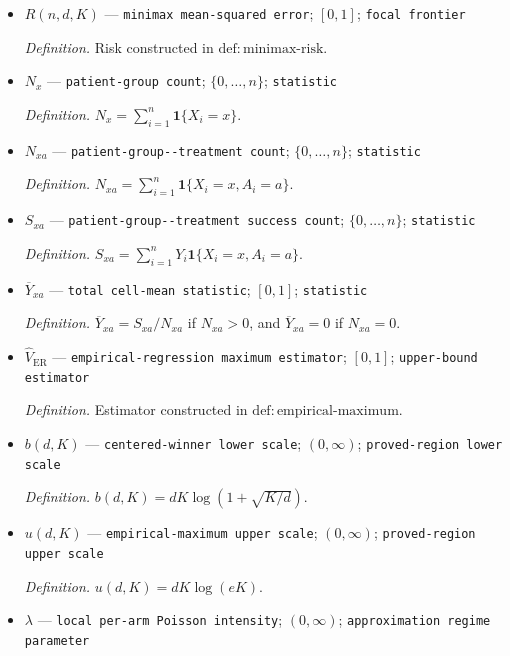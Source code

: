 \documentclass{article}
\begin{document}
\begin{itemize}
  \par\smallskip\noindent\emph{Definition.} Generic measurable estimator of \(V^\star(P)\).
  \item \(R(n,d,K)\) --- \texttt{minimax mean-\allowbreak{}squared error}; \([0,1]\); \texttt{focal frontier}
  \par\smallskip\noindent\emph{Definition.} Risk constructed in \(\mathrm{def{:}minimax\text{-}risk}\).
  \item \(N_x\) --- \texttt{patient-\allowbreak{}group count}; \(\{0,\ldots,n\}\); \texttt{statistic}
  \par\smallskip\noindent\emph{Definition.} \(N_x=\sum_{i=1}^n\mathbf 1\{X_i=x\}\).
  \item \(N_{xa}\) --- \texttt{patient-\allowbreak{}group-\allowbreak{}-\allowbreak{}treatment count}; \(\{0,\ldots,n\}\); \texttt{statistic}
  \par\smallskip\noindent\emph{Definition.} \(N_{xa}=\sum_{i=1}^n\mathbf 1\{X_i=x,A_i=a\}\).
  \item \(S_{xa}\) --- \texttt{patient-\allowbreak{}group-\allowbreak{}-\allowbreak{}treatment success count}; \(\{0,\ldots,n\}\); \texttt{statistic}
  \par\smallskip\noindent\emph{Definition.} \(S_{xa}=\sum_{i=1}^nY_i\mathbf 1\{X_i=x,A_i=a\}\).
  \item \(\overline Y_{xa}\) --- \texttt{total cell-\allowbreak{}mean statistic}; \([0,1]\); \texttt{statistic}
  \par\smallskip\noindent\emph{Definition.} \(\overline Y_{xa}=S_{xa}/N_{xa}\) if \(N_{xa}>0\), and \(\overline Y_{xa}=0\) if \(N_{xa}=0\).
  \item \(\widehat V_{\mathrm{ER}}\) --- \texttt{empirical-\allowbreak{}regression maximum estimator}; \([0,1]\); \texttt{upper-\allowbreak{}bound estimator}
  \par\smallskip\noindent\emph{Definition.} Estimator constructed in \(\mathrm{def{:}empirical\text{-}maximum}\).
  \item \(b(d,K)\) --- \texttt{centered-\allowbreak{}winner lower scale}; \((0,\infty)\); \texttt{proved-\allowbreak{}region lower scale}
  \par\smallskip\noindent\emph{Definition.} \(b(d,K)=dK\log(1+\sqrt{K/d})\).
  \item \(u(d,K)\) --- \texttt{empirical-\allowbreak{}maximum upper scale}; \((0,\infty)\); \texttt{proved-\allowbreak{}region upper scale}
  \par\smallskip\noindent\emph{Definition.} \(u(d,K)=dK\log(eK)\).
  \item \(\lambda\) --- \texttt{local per-\allowbreak{}arm Poisson intensity}; \((0,\infty)\); \texttt{approximation regime parameter}

\end{itemize}
\end{document}
